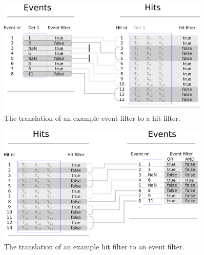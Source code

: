 \begin{figure}[h]
   \centering
    \centerline{\includegraphics[width=0.9\textwidth]{Graphics/Filter_event2hit.pdf}}
\caption{The translation of an example event filter to a hit filter.}
\label{Data_structure_schematic}
\end{figure}

\begin{figure}[h]
   \centering
    \centerline{\includegraphics[width=0.9\textwidth]{Graphics/Filter_hit2event.pdf}}
\caption{The translation of an example hit filter to an event filter.}
\label{Data_structure_schematic}
\end{figure}

